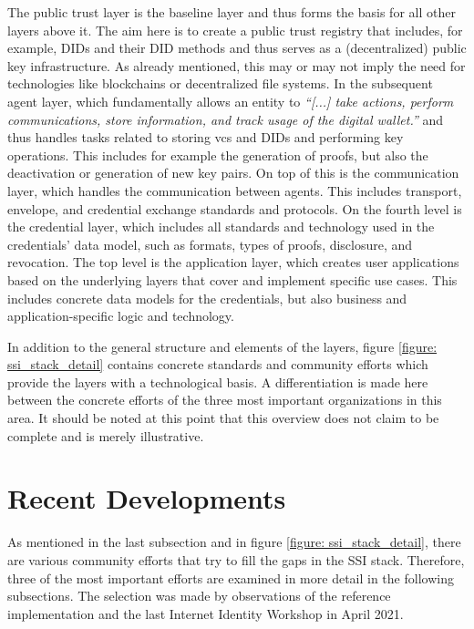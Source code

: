         The public trust layer is the baseline layer and thus forms the basis for all other layers above it. The aim here is to create a public trust registry that includes, for example, \acp{DID} and their \ac{DID} methods and thus serves as a (decentralized) public key infrastructure. As already mentioned, this may or may not imply the need for technologies like blockchains or decentralized file systems. In the subsequent agent layer, which fundamentally allows an entity to \textit{“[...] take actions, perform communications, store information, and track usage of the digital wallet.”} \cite[p. 192]{preukschat_self-sovereign_2021} and thus handles tasks related to storing \acp{vc} and \acp{DID} and performing key operations. This includes for example the generation of proofs, but also the deactivation or generation of new key pairs. On top of this is the communication layer, which handles the communication between agents. This includes transport, envelope, and credential exchange standards and protocols. On the fourth level is the credential layer, which includes all standards and technology used in the credentials' data model, such as formats, types of proofs, disclosure, and revocation. The top level is the application layer, which creates user applications based on the underlying layers that cover and implement specific use cases. This includes concrete data models for the credentials, but also business and application-specific logic and technology. \cite{heck_ssi_2020, yildiz_layers_2021, davie_0289_2021, preukschat_self-sovereign_2021}
        
        In addition to the general structure and elements of the layers, figure \ref{figure: ssi_stack_detail} contains concrete standards and community efforts which provide the layers with a technological basis. A differentiation is made here between the concrete efforts of the three most important organizations in this area. It should be noted at this point that this overview does not claim to be complete and is merely illustrative.
		
	\section{Recent Developments}
	    As mentioned in the last subsection and in figure \ref{figure: ssi_stack_detail}, there are various community efforts that try to fill the gaps in the SSI stack. Therefore, three of the most important efforts are examined in more detail in the following subsections. The selection was made by observations of the reference implementation and the last Internet Identity Workshop in April 2021.
	    
